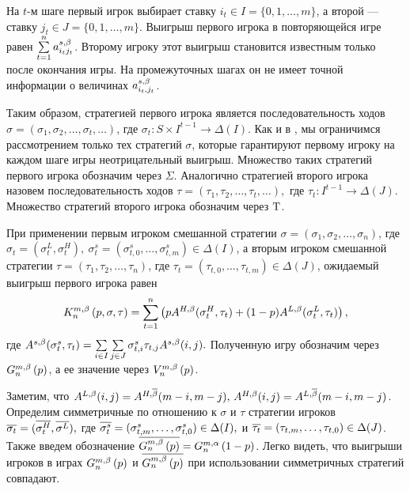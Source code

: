 На $t$-м шаге первый игрок выбирает ставку $i_t \in I = \{0, 1, \ldots, m\}$, а
второй --- ставку $j_t \in J = \{0, 1, \ldots, m\}$. Выигрыш первого игрока в
повторяющейся игре равен $\sum\limits_{t=1}^n a_{i_t j_t}^{s,\Co}$. Второму
игроку этот выигрыш становится известным только после окончания игры. На
промежуточных шагах он не имеет точной информации о величинах $a_{i_t,
  j_t}^{s,\Co}$.

Таким образом, стратегией первого игрока является последовательность ходов
$\sigma = (\sigma_1, \sigma_2, \ldots, \sigma_t, \ldots)$, где $\sigma_t: S
\times I^{t-1} \rightarrow \Delta(I)$. Как и в \cite{domansky07}, мы ограничимся
рассмотрением только тех стратегий $\sigma$, которые гарантируют первому игроку
на каждом шаге игры неотрицательный выигрыш. Множество таких стратегий первого
игрока обозначим через $\Sigma$. Аналогично стратегией второго игрока назовем
последовательность ходов $ \tau = (\tau_1, \tau_2, \ldots, \tau_t, \ldots), $
где $ \tau_t: I^{t-1} \rightarrow \Delta(J) $. Множество стратегий второго
игрока обозначим через $\Tau$.

При применении первым игроком смешанной стратегии $\sigma = (\sigma_1, \sigma_2,
\ldots, \sigma_n)$, где $\sigma_t = (\sigma_t^L, \sigma_t^H),\ \sigma^s_t =
(\sigma^s_{t,0}, \ldots, \sigma^s_{t,m}) \in \Delta(I)$, а вторым игроком
смешанной стратегии $\tau = (\tau_1, \tau_2, \ldots, \tau_n)$, где $ \tau_t =
(\tau_{t,0}, \ldots, \tau_{t,m}) \in \Delta(J)$, ожидаемый выигрыш первого
игрока равен
\begin{equation}
  \label{eq:firstPlayerPayoff}
  \firstPlayerPayoff{n}{p}{\sigma}{\tau} = \sum_{t=1}^n
  \left(
    pA^{H,\Co}(\sigma_t^H, \tau_t) + (1 - p)A^{L,\Co}(\sigma_t^L, \tau_t)
  \right),
\end{equation}
где $ A^{s,\Co}(\sigma^s_t,\tau_t) = \sum\limits_{i \in I} \sum\limits_{j \in
  J} \sigma^s_{t, i} \tau_{t, j} A^{s,\Co}(i, j). $ Полученную игру обозначим
через $\generalGame{n}{p}$, а ее значение через $\gameValue{n}{p}$.

Заметим, что $A^{L,\Co}(i,j) = A^{H,\DCo}(m-i,m-j), \, A^{H,\Co}(i,j) =
A^{L,\DCo}(m-i,m-j)$. Определим симметричные по отношению к $\sigma$ и $\tau$
стратегии игроков $ \symm{\sigma_t} = (\symm{\sigma^H_t}, \symm{\sigma^L}), $
где $ \symm{\sigma^s_t} = (\sigma^s_{t,m},\ldots,\sigma^s_{t,0}) \in \Delta(I),
$ и $ \symm{\tau_t} = (\tau_{t,m},\ldots,\tau_{t,0}) \in \Delta(J) $. Также
введем обозначение $\symm{\generalGame{n}{p}} = \symmGameExpression[n]{1-p}$.
Легко видеть, что выигрыши игроков в играх $\generalGame{n}{p}$ и
$\symm{\generalGame{n}{p}}$ при использовании симметричных стратегий совпадают.

